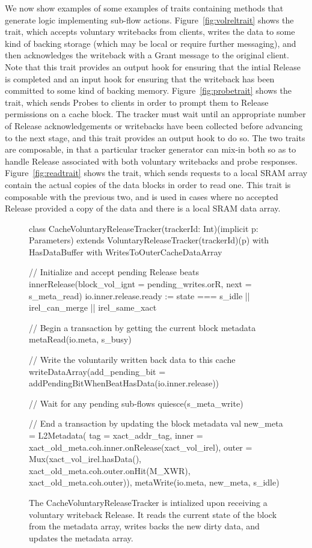 We now show examples of some examples of traits containing methods that generate logic implementing sub-flow actions.
Figure~\ref{fig:volreltrait} shows the  trait, which accepts voluntary writebacks from clients,
writes the data to some kind of backing storage (which may be local or require further messaging),
and then acknowledges the writeback with a Grant message to the original client.
Note that this trait provides an output hook for ensuring that the intial Release is completed
and an input hook for ensuring that the writeback has been committed to some kind of backing memory.
Figure~\ref{fig:probetrait} shows the  trait, which sends Probes to clients in order to prompt them to Release permissions on a cache block.
The tracker must wait until an appropriate number of Release acknowledgements or writebacks have been collected before advancing
to the next stage, and this trait provides an output hook to do so.
The two traits are composable, in that a particular tracker generator can mix-in both so as to handle Release associated with
both voluntary writebacks and probe responses.
Figure~\ref{fig:readtrait} shows the  trait, which sends requests to a local SRAM array contain the actual copies of the data blocks in order to read one.
This trait is composable with the previous two, and is used in cases where no accepted Release provided a copy of the data and there is a local SRAM data array.

\begin{figure}
\centering
\begin{scala}
class CacheVoluntaryReleaseTracker(trackerId: Int)(implicit p: Parameters)
    extends VoluntaryReleaseTracker(trackerId)(p)
    with HasDataBuffer
    with WritesToOuterCacheDataArray {
  // Initialize and accept pending Release beats
  innerRelease(block_vol_ignt = pending_writes.orR, next = s_meta_read)
  io.inner.release.ready := state === s_idle || irel_can_merge || irel_same_xact

  // Begin a transaction by getting the current block metadata
  metaRead(io.meta, s_busy)

  // Write the voluntarily written back data to this cache
  writeDataArray(add_pending_bit = addPendingBitWhenBeatHasData(io.inner.release))

  // Wait for any pending sub-flows
  quiesce(s_meta_write)

  // End a transaction by updating the block metadata
  val new_meta = 
    L2Metadata(
      tag = xact_addr_tag,
      inner = xact_old_meta.coh.inner.onRelease(xact_vol_irel),
      outer = Mux(xact_vol_irel.hasData(),
                  xact_old_meta.coh.outer.onHit(M_XWR),
                  xact_old_meta.coh.outer)),
  metaWrite(io.meta, new_meta, s_idle)       
}
\end{scala} 
\caption[The CacheVoluntaryReleaseTracker.]{
The CacheVoluntaryReleaseTracker is intialized upon receiving a voluntary writeback Release.
It reads the current state of the block from the metadata array, writes backs the new dirty data,
and updates the metadata array.
}
\label{fig:volreltracker}
\end{figure}


